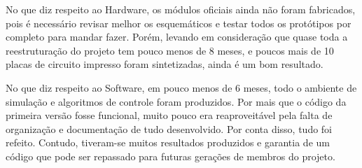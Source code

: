 \documentclass[]{politex}
\begin{document}
No que diz respeito ao Hardware, os módulos oficiais ainda não foram fabricados, pois é necessário revisar melhor os esquemáticos e testar todos os protótipos por completo para mandar fazer. Porém, levando em consideração que quase toda a reestruturação do projeto tem pouco menos de 8 meses, e poucos mais de 10 placas de circuito impresso foram sintetizadas, ainda é um bom resultado.

No que diz respeito ao Software, em pouco menos de 6 meses, todo o ambiente de simulação e algoritmos de controle foram produzidos. Por mais que o código da primeira versão fosse funcional, muito pouco era reaproveitável pela falta de organização e documentação de tudo desenvolvido. Por conta disso, tudo foi refeito. Contudo, tiveram-se muitos resultados produzidos e garantia de um código que pode ser repassado para futuras gerações de membros do projeto.






\apendice


\anexo

\end{document}
